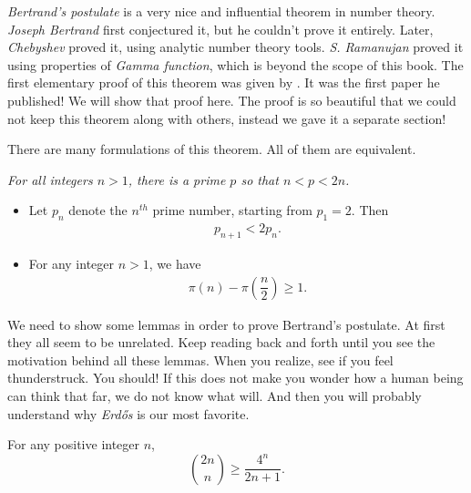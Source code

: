 \documentclass{subfile}
\begin{document}
	\label{sec:bertrandspostulate}
	\textit{Bertrand's postulate} is a very nice and influential theorem in number theory. \textit{Joseph Bertrand} first conjectured it, but he couldn't prove it entirely. Later, \textit{Chebyshev} proved it, using analytic number theory tools. \textit{S. Ramanujan} \cite{meher_murty_2013} proved it using properties of \textit{Gamma function}, which is beyond the scope of this book. The first elementary proof of this theorem was given by \cite{erdos_1932}. It was the first paper he published! We will show that proof here. The proof is so beautiful that we could not keep this theorem along with others, instead we gave it a separate section!
	
	There are many formulations of this theorem. All of them are equivalent.
	
	\begin{theorem}\slshape
		For all integers $n>1$, there is a prime $p$ so that $n<p<2n$.\label{thm:bertrand}
	\end{theorem}
	
	\begin{theorem}\slshape\label{thm:bertrandalternative}
		\begin{itemize}
			\item Let $p_n$ denote the $n^{th}$ prime number, starting from $p_1=2$. Then
			\begin{eqnarray*}
				p_{n+1} <2p_n.
			\end{eqnarray*}
			\item For any integer $n >1$, we have
			\begin{eqnarray*}
				\pi(n)-\pi\left(\dfrac{n}{2}\right)\geq1.
			\end{eqnarray*}
		\end{itemize}
	\end{theorem}
	
	We need to show some lemmas in order to prove Bertrand's postulate. At first they all seem to be unrelated. Keep reading back and forth until you see the motivation behind all these lemmas. When you realize, see if you feel thunderstruck. You should! If this does not make you wonder how a human being can think that far, we do not know what will. And then you will probably understand why \textit{Erd\H {o}s} is our most favorite.
	
	\begin{lemma}\label{lem:bertrand1}
		For any positive integer $n$,
		\[\binom{2n}{n}\geq\dfrac{4^n}{2n+1}.\]
	\end{lemma}
	
\end{document}
